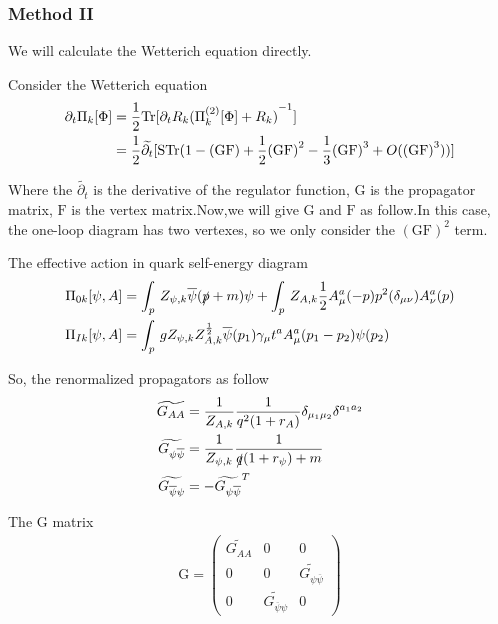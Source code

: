 \documentclass[UTF8]{ctexart}
\begin{document}
\subsubsection{Method II}
We will calculate the Wetterich equation directly.
\par Consider the Wetterich equation
\begin{align}
\partial_{t}\Pi_k [\Phi]&=\frac{1}{2}\mathrm{Tr}[\partial_{t}R_{k}{(\Pi_{k}^{(2)} [\Phi]+R_{k})}^{-1}]
\notag\\&=\frac{1}{2}\widetilde{\partial_{t}}[\mathrm{STr}(1-\mathrm{(GF)}+\frac{1}{2}\mathrm{{(GF)}^2}-\frac{1}{3}\mathrm{{(GF)}^3}+O(\mathrm{{(GF)}^3}))]
\end{align}
\par Where the $\tilde{\partial_{t}}$ is the derivative of the regulator function, $\mathrm{G}$ is the propagator matrix, $\mathrm{F}$ is the vertex matrix.Now,we will give $\mathrm{G}$ and $\mathrm{F}$ as follow.In this case, the one-loop diagram has two vertexes, so we only consider the $\mathrm{{(GF)}^2}$ term.
\par The effective action in quark self-energy diagram
\begin{align}
\Pi_{0k}[\psi,A]&=\int_{p}\,Z_{\psi,k}\overline{\psi}(\slashed{p}+m)\psi+\int_{p}\,Z_{A,k}{\frac{1}{2}}A_{\mu}^{a}(-p)p^{2}(\delta_{\mu\nu})A_{\nu}^{a}(p)
\\\Pi_{Ik}[\psi,A]&=\int_{p}\,gZ_{\psi,k}Z_{A,k}^{\frac{1}{2}}\overline{\psi}(p_1)\gamma_{\mu}t^{a}A_{\mu}^{a}(p_1-p_2)\psi(p_2)
\end{align}
\par So, the renormalized propagators as follow
\begin{align}
\widetilde{G_{AA}}&=\frac{1}{Z_{A,k}}\frac{1}{{q}^2 (1+r_A)}\delta_{\mu_1 \mu_2}\delta^{a_1 a_2}
\\\widetilde{G_{\psi\overline{\psi}}}&=\frac{1}{Z_{\psi,k}}\frac{1}{\slashed{q}(1+r_{\psi})+m}
\\\widetilde{G_{\overline{\psi}\psi}}&=-{\widetilde{G_{\psi\overline{\psi}}}}^{T}
\end{align}
\par The $\mathrm{G}$ matrix
\begin{gather}
\mathrm{G}=\begin{pmatrix}\widetilde{G_{AA}}&0&0\\0&0&\widetilde{G_{\psi\overline{\psi}}}\\0&{\widetilde{G_{\overline{\psi}\psi}}}&0\end{pmatrix}
\end{gather}
\end{document}
